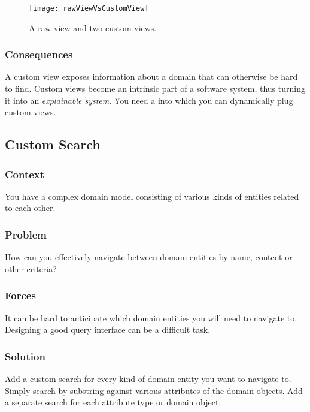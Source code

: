 \documentclass[sigconf]{acmart}
\renewcommand{\nbc}[3]{} %
\newcommand\eog[1]{\nbc{Edward}{#1}{purple}}
\newcommand{\pattern}[1]{\emph{\nameref{pat:#1}}\xspace}
\begin{document}
\begin{figure}[h]
  \texttt{[image: rawViewVsCustomView]}
  \caption{A raw view and two custom views.}
  \label{fig:rawViewVsCustomView}
\end{figure}

\subsubsection*{Consequences}
A custom view exposes information about a domain that can otherwise be hard to find.
Custom views become an intrinsic part of a software system, thus turning it into an \emph{explainable system}.
You need a \pattern{moldableTool} into which you can dynamically plug custom views.

\eog{Down here, there's mention of what a you need a moldable tool, but I still don't understand what a moldable tool is given just this paper so far.}

\subsection*{Custom Search}\label{pat:customSearch}
\subsubsection*{Context}
You have a complex domain model consisting of various kinds of entities related to each other.

\subsubsection*{Problem}
How can you effectively navigate between domain entities by name, content or other criteria?

\subsubsection*{Forces}
It can be hard to anticipate which domain  entities you will need to navigate to.
Designing a good query interface can be a difficult task.

\subsubsection*{Solution}
Add a custom search for every kind of domain entity you want to navigate to.
Simply search by substring against various attributes of the domain objects.
Add a separate search for each attribute type or domain object.
\end{document}
